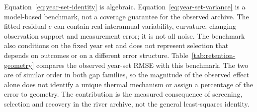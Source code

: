 Equation~\eqref{eq:year-set-identity} is algebraic. Equation~\eqref{eq:year-set-variance} is a model-based benchmark, not a coverage guarantee for the observed archive. The fitted residual $e$ can contain real interannual variability, curvature, changing observation support and measurement error; it is not all noise. The benchmark also conditions on the fixed year set and does not represent selection that depends on outcomes or on a different error structure. Table~\ref{tab:retention-geometry} compares the observed year-set RMSE with this benchmark. The two are of similar order in both gap families, so the magnitude of the observed effect alone does not identify a unique thermal mechanism or assign a percentage of the error to geometry. The contribution is the measured consequence of screening, selection and recovery in the river archive, not the general least-squares identity.


